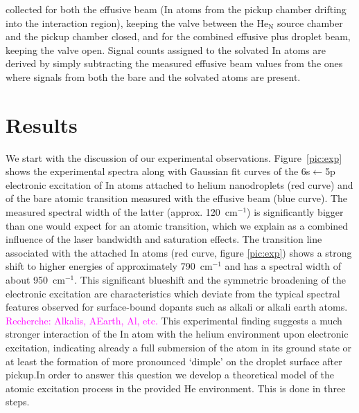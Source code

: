 \documentclass[twoside,twocolumn,9pt]{article}
\def\hl#1{\textcolor{magenta}{#1}}  %
\begin{document}
collected for both the effusive beam (In atoms from the pickup chamber drifting into the interaction region), keeping the valve between the He$_\mathrm{N}$ source chamber and the pickup chamber closed, and for the combined effusive plus droplet beam, keeping the valve open. Signal counts assigned to the solvated In atoms are derived by simply subtracting the measured effusive beam values from the ones where signals from both the bare and the solvated atoms are present. 

\section{Results}
We start with the discussion of our experimental observations. Figure~\ref{pic:exp} shows the experimental spectra along with Gaussian fit curves of the 6s$\leftarrow{}$5p electronic excitation of In atoms attached to helium nanodroplets (red curve) and of the bare atomic transition measured with the effusive beam (blue curve). The measured spectral width of the latter (approx. 120~cm$^{-1}$) is significantly bigger than one would expect for an atomic transition, which we explain as a combined influence of the laser bandwidth and saturation effects. The transition line associated with the attached In atoms (red curve, figure \ref{pic:exp}) shows a strong shift to higher energies of approximately 790~cm$^{-1}$ and has a spectral width of about 950~cm$^{-1}$. This significant blueshift and the symmetric broadening of the electronic excitation are characteristics which deviate from the typical spectral features observed for surface-bound dopants such as alkali or alkali earth atoms. \hl{Recherche: Alkalis, AEarth, Al, etc.} This experimental finding suggests a much stronger interaction of the In atom with the helium environment upon electronic excitation, indicating already a full submersion of the atom in its ground state or at least the formation of  more pronounced `dimple' on the droplet surface after pickup.In order to answer this question we develop a theoretical model of the atomic excitation process in the provided He environment. This is done in three steps.
\end{document}
